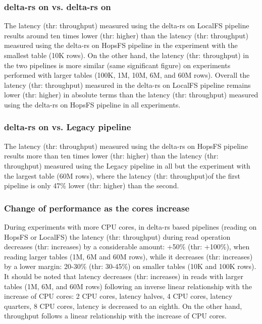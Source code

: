 \subsubsection*{delta-rs on  vs. delta-rs on }

The latency (thr: throughput) measured using the delta-rs on \gls{LocalFS} pipeline results around ten times lower (thr: higher) than the latency (thr: throughput) measured using the delta-rs on \gls{HopsFS} pipeline in the experiment with the smallest table (10K rows). On the other hand, the latency (thr: throughput) in the two pipelines is more similar (same significant figure) on experiments performed with larger tables (100K, 1M, 10M, 6M, and 60M rows). Overall the latency (thr: throughput) measured in the delta-rs on \gls{LocalFS} pipeline remains lower (thr: higher) in absolute terms than the latency (thr: throughput) measured using the delta-rs on \gls{HopsFS} pipeline in all experiments.

\subsubsection*{delta-rs on  vs. Legacy pipeline}

The latency (thr: throughput) measured using the delta-rs on \gls{HopsFS} pipeline results more than ten times lower (thr: higher) than the latency (thr: throughput) measured using the Legacy pipeline in all but the experiment with the largest table (60M rows), where the latency (thr: throughput)of the first pipeline is only 47\% lower (thr: higher) than the second. 

\subsubsection*{Change of performance as the  cores increase}

During experiments with more \gls{CPU} cores, in delta-rs based pipelines (reading on \gls{HopsFS} or \gls{LocalFS}) the latency (thr: throughput) during read operation decreases (thr: increases) by a considerable amount: +50\% (thr: +100\%), when reading larger tables (1M, 6M and 60M rows), while it decreases (thr: increases) by a lower margin: 20-30\% (thr: 30-45\%) on smaller tables (10K and 100K rows). It should be noted that latency decreases (thr: increases) in reads with larger tables (1M, 6M, and 60M rows) following an inverse linear relationship with the increase of \gls{CPU} cores: 2 \gls{CPU} cores, latency halves, 4 \gls{CPU} cores, latency quarters, 8 \gls{CPU} cores, latency is decreased to an eighth. On the other hand, throughput follows a linear relationship with the increase of \gls{CPU} cores.

